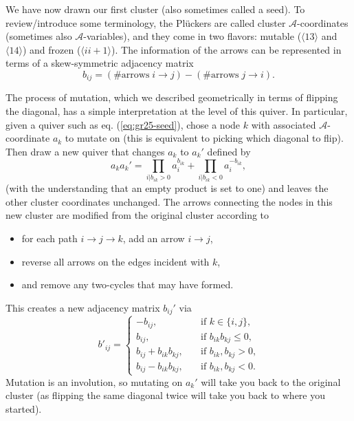 \documentclass[11pt]{article}
\def\ket#1{\langle #1 \rangle}
\def\a{\mathcal{A}}
\begin{document}
We have now drawn our first cluster (also sometimes called a seed). To review/introduce some terminology, the Pl\"uckers are called cluster $\a$-coordinates (sometimes also $\a$-variables), and they come in two flavors: mutable ($\ket{13}$ and $\ket{14}$) and frozen ($\ket{ii+1}$). The information of the arrows can be represented in terms of a skew-symmetric adjacency matrix
\begin{equation}
	b_{i j} = (\# \text{arrows}\; i \to j) - (\# \text{arrows}\; j \to i).
\label{eq:bijdef}
\end{equation}

The process of mutation, which we described geometrically in terms of flipping the diagonal, has a simple interpretation at the level of this quiver. In particular, given a quiver such as eq. (\ref{eq:gr25-seed}), chose a node $k$ with associated $\a$-coordinate $a_k$ to mutate on (this is equivalent to picking which diagonal to flip). Then draw a new quiver that changes $a_{k}$ to $a_{k}'$ defined by
\begin{equation}
  \label{eq:mutation}
  a_{k} a_{k}' = \prod_{i \vert b_{i k} > 0} a_{i}^{b_{i k}} + \prod_{i \vert b_{i k} < 0} a_{i}^{-b_{i k}},
\end{equation} (with the understanding that an empty product is set to one) and leaves the other cluster coordinates unchanged. The arrows connecting the nodes in this new cluster are modified from the original cluster according to
\begin{itemize}
	\item for each path $i\to j \to k$, add an arrow $i\to j$,
	\item reverse all arrows on the edges incident with $k$,
	\item and remove any two-cycles that may have formed.
\end{itemize}
This creates a new adjacency matrix $b_{ij}'$ via 
\begin{equation}
  \label{eq:b-mutation}
  b'_{i j} =
  \begin{cases}
    -b_{i j}, &\quad \text{if $k \in \lbrace i, j\rbrace$,}\\
    b_{i j}, &\quad \text{if $b_{i k} b_{k j} \leq 0$,}\\
    b_{i j} + b_{i k} b_{k j}, &\quad \text{if $b_{i k}, b_{k j} > 0$,}\\
    b_{i j} - b_{i k} b_{k j}, &\quad \text{if $b_{i k}, b_{k j} < 0$.}
  \end{cases}
\end{equation}
Mutation is an involution, so mutating on $a_k'$ will take you back to the original cluster (as flipping the same diagonal twice will take you back to where you started). 
\end{document}
